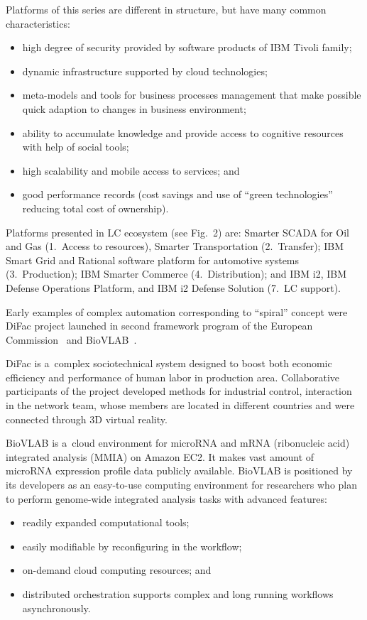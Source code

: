 \begin{multicols}{2}
 Platforms of this series are different in structure, but have many common characteristics:
 \begin{itemize}
  \item  high degree of security provided by software products of IBM Tivoli family;
  \item dynamic infrastructure supported by cloud technologies;
\item meta-models and tools for business processes management  that make possible  quick adaption to
changes in business environment;
\item ability to accumulate knowledge and provide access to cognitive resources with help of social tools;
\item high scalability and mobile access to services; and
\item good  performance records (cost savings and use of ``green technologies'' reducing total cost of
ownership).
  \end{itemize}

 Platforms presented in LC ecosystem (see Fig.~2) are: Smarter SCADA for Oil and Gas (1.~Access to
resources), Smarter Transportation (2.~Transfer); IBM Smart Grid and Rational software platform for
automotive systems (3.~Production); IBM Smarter Commerce (4.~Distribution);
and IBM i2, IBM
Defense Operations Platform, and IBM i2 Defense Solution (7.~LC support).

 Early examples of complex automation corresponding to ``spiral'' concept were DiFac project launched in
second framework program of the European Commission~\cite{7-sor}
and BioVLAB~\cite{8-sor}.

DiFac is a~complex sociotechnical system designed to boost both economic efficiency and performance of
human labor in production area. Collaborative participants of the project developed methods for industrial
control, interaction in the network team, whose members are located in different countries and were
connected through 3D virtual reality.

 BioVLAB is a~cloud environment for microRNA and mRNA (ribonucleic acid) integrated analysis (MMIA)
on Amazon EC2. It makes vast amount of microRNA expression profile data publicly available.  BioVLAB
is positioned by its developers as an easy-to-use computing environment for researchers who plan to
perform genome-wide integrated analysis tasks with advanced features:
 \begin{itemize}
  \item readily expanded computational tools;\\[-14pt]
  \item easily modifiable by reconfiguring in the workflow;\\[-14pt]
  \item on-demand cloud computing resources; and\\[-14pt]
  \item  distributed orchestration supports complex and long running workflows asynchronously.
  \end{itemize}


\end{multicols}
